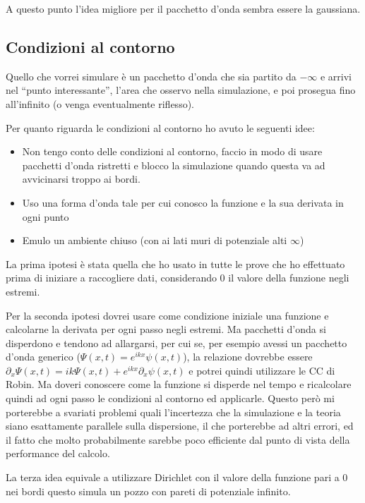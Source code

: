 A questo punto l'idea migliore per il pacchetto d'onda sembra essere la gaussiana.


\subsection{Condizioni al contorno}
Quello che vorrei simulare \`e un pacchetto d'onda che sia partito da $-\infty$ e arrivi nel ``punto interessante'', l'area che osservo nella simulazione, e poi prosegua fino all'infinito (o venga eventualmente riflesso).

Per quanto riguarda le condizioni al contorno ho avuto le seguenti idee:
\begin{itemize}
\item Non tengo conto delle condizioni al contorno, faccio in modo di usare pacchetti d'onda ristretti e blocco la simulazione quando questa va ad  avvicinarsi troppo ai bordi.
\item Uso una forma d'onda tale per cui conosco la funzione e la sua derivata in ogni punto
\item Emulo un ambiente chiuso (con ai lati muri di potenziale alti $\infty$)
\end{itemize}
La prima ipotesi \`e stata quella che ho usato in tutte le prove che ho effettuato prima di iniziare a raccogliere dati, considerando 0 il valore della funzione negli estremi.

Per la seconda ipotesi dovrei usare come condizione iniziale una funzione e calcolarne la derivata per ogni passo negli estremi. Ma pacchetti d'onda si disperdono e tendono ad allargarsi, per cui se,  per esempio avessi un pacchetto d'onda generico ($\Psi(x,t) = e^{ikx} \psi(x,t)$), la relazione dovrebbe essere $\partial_x \Psi(x,t) = ik \Psi(x,t) + e^{ikx}\partial_x\psi(x,t)$ e potrei quindi utilizzare le CC di Robin. Ma doveri conoscere come la funzione si disperde nel tempo e ricalcolare quindi  ad ogni passo le condizioni al contorno ed applicarle. Questo per\`o mi porterebbe a svariati problemi quali l'incertezza che la simulazione e la teoria siano esattamente parallele sulla dispersione, il che porterebbe ad altri errori, ed il fatto che molto probabilmente sarebbe poco efficiente dal punto di vista della performance del calcolo.

La terza idea equivale a utilizzare Dirichlet con il valore della funzione pari a 0 nei bordi questo simula un pozzo con pareti di potenziale infinito.


